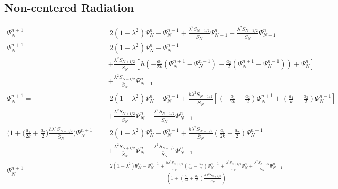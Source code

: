 \documentclass[dvipsnames]{article}
\begin{document}
\subsection{Non-centered Radiation}\label{app:nonCentRad}
\begin{align}
    \Psi_N^{n+1} = &\ 2(1-\lambda^2)\Psi_N^n-\Psi_N^{n-1}+ \frac{\lambda^2S_{N+1/2}}{\bar S_N}\Psi_{N+1}^n + \frac{\lambda^2S_{N-1/2}}{\bar S_N}\Psi_{N-1}^n\nonumber\\
    \Psi_N^{n+1} = &\ 2(1-\lambda^2)\Psi_N^n-\Psi_N^{n-1}\nonumber\\
    &+\frac{\lambda^2S_{N+1/2}}{\bar S_N}\left[h\left(-\frac{a_1}{2k}(\Psi_N^{n+1} - \Psi_N^{n-1}) - \frac{a_2}{2}(\Psi_N^{n+1} + \Psi_N^{n-1})\right)+\Psi_N^n\right]\nonumber\\
    &+ \frac{\lambda^2S_{N-1/2}}{\bar S_N}\Psi_{N-1}^n\nonumber\\
    \Psi_N^{n+1} = &\ 2(1-\lambda^2)\Psi_N^n-\Psi_N^{n-1}+ \frac{h\lambda^2S_{N+1/2}}{\bar S_N}\left[\left(-\frac{a_1}{2k} - \frac{a_2}{2}\right)\Psi_N^{n+1} + \left(\frac{a_1}{k}-\frac{a_2}{2}\right)\Psi_N^{n-1}\right]\nonumber\\
    &+ \frac{\lambda^2S_{N+1/2}}{\bar S_N}\Psi_{N}^n+ \frac{\lambda^2S_{N-1/2}}{\bar S_N}\Psi_{N-1}^n \nonumber\\
    \!\!\!\!\!\!\!\!\!\!\!\!\!\!\!\!\!\!\!\!\!\!\!\!\!\!\!\!\!\!\!\!\!\!\!\!\!\!\!\!\!\!\!\!\bigg(1+\Big(\frac{a_1}{2k}+\frac{a_2}{2}\Big)\frac{h\lambda^2S_{N+1/2}}{\bar S_N}\bigg)\Psi_N^{n+1} =&\  2(1-\lambda^2)\Psi_N^n-\Psi_N^{n-1}+\frac{h\lambda^2S_{N+1/2}}{\bar S_N}\left(\frac{a_1}{2k}-\frac{a_2}{2}\right)\Psi_N^{n-1}\nonumber\\
    &+ \frac{\lambda^2S_{N+1/2}}{\bar S_N}\Psi_{N}^n+ \frac{\lambda^2S_{N-1/2}}{\bar S_N}\Psi_{N-1}^n \nonumber\\
    \Psi_N^{n+1} = &\  \frac{2(1-\lambda^2)\Psi_N^n-\Psi_N^{n-1}+\frac{h\lambda^2S_{N+1/2}}{\bar S_N}\left(\frac{a_1}{2k}-\frac{a_2}{2}\right)\Psi_N^{n-1} + \frac{\lambda^2S_{N+1/2}}{\bar S_N}\Psi_{N}^n + \frac{\lambda^2S_{N-1/2}}{\bar S_N}\Psi_{N-1}^n}{\left(1+\left(\frac{a_1}{2k}+\frac{a_2}{2}\right)\frac{h\lambda^2S_{N+1/2}}{\bar S_N}\right)}
\end{align}
\end{document}
